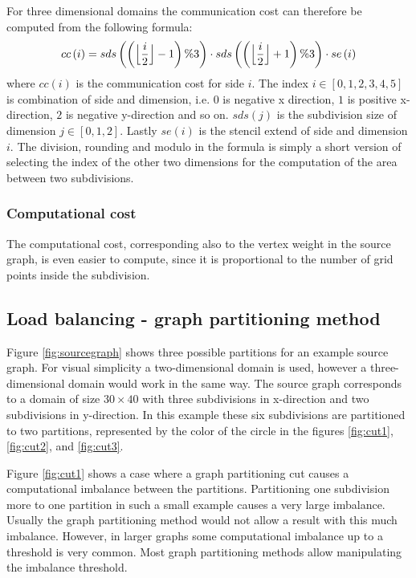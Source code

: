 For three dimensional domains the communication cost can therefore be computed from the following formula:
\begin{equation}
cc\left(i\right) = sds\left(\left(\floor[\Big]{\frac{i}{2}} - 1\right) \% 3 \right) \cdot sds\left(\left(\floor[\Big]{\frac{i}{2}} + 1\right) \% 3 \right) \cdot se\left(i\right)
\end{equation}
where $cc\left(i\right)$ is the communication cost for side $i$.
The index $i \in \left[0, 1, 2, 3, 4, 5\right]$ is combination of side and dimension, i.e. $0$ is negative x direction, $1$ is positive x-direction, $2$ is negative y-direction and so on.
$sds\left(j\right)$ is the subdivision size of dimension $j \in \left[0,1,2\right]$.
Lastly $se\left(i\right)$ is the stencil extend of side and dimension $i$.
The division, rounding and modulo in the formula is simply a short version of selecting the index of the other two dimensions for the computation of the area between two subdivisions.

\subsubsection{Computational cost}
\label{sec:compcost}
The computational cost, corresponding also to the vertex weight in the source graph, is even easier to compute, since it is proportional to the number of grid points inside the subdivision.

\subsection{Load balancing - graph partitioning method}

Figure \ref{fig:sourcegraph} shows three possible partitions for an example source graph.
For visual simplicity a two-dimensional domain is used, however a three-dimensional domain would work in the same way.
The source graph corresponds to a domain of size $30 \times 40$ with three subdivisions in x-direction and two subdivisions in y-direction.
In this example these six subdivisions are partitioned to two partitions, represented by the color of the circle in the figures \ref{fig:cut1}, \ref{fig:cut2}, and \ref{fig:cut3}.

Figure \ref{fig:cut1} shows a case where a graph partitioning cut causes a computational imbalance between the partitions.
Partitioning one subdivision more to one partition in such a small example causes a very large imbalance.
Usually the graph partitioning method would not allow a result with this much imbalance.
However, in larger graphs some computational imbalance up to a threshold is very common.
Most graph partitioning methods allow manipulating the imbalance threshold.

